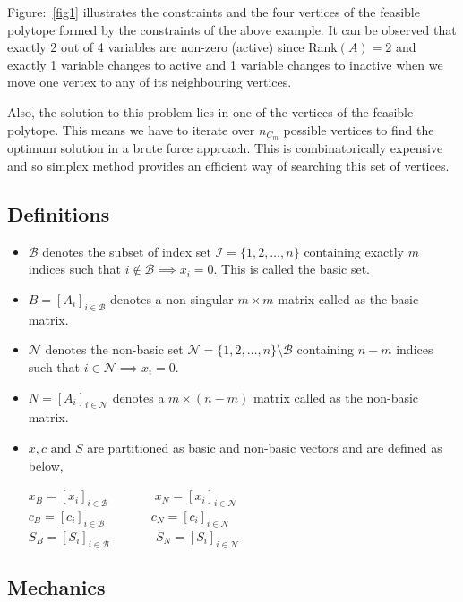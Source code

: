\documentclass[12pt,letterpaper]{article}
\begin{document}
Figure:~\ref{fig1} illustrates the constraints and the four vertices of the feasible polytope formed by the constraints of the above example. It can be observed that exactly 2 out of 4 variables are non-zero (active) since Rank$(A)=2$ and exactly 1 variable changes to active and 1 variable changes to inactive when we move one vertex to any of its neighbouring vertices.

Also, the solution to this problem lies in one of the vertices of the feasible polytope. This means we have to iterate over $n_{C_m}$ possible vertices to find the optimum solution in a brute force approach. This is combinatorically expensive and so simplex method provides an efficient way of searching this set of vertices.

\subsection{Definitions}

\begin{itemize}
	\item $\mathcal{B}$ denotes the subset of index set $\mathcal{I} = \{1,2,\dots,n\}$ containing exactly $m$ indices such that $i \notin \mathcal{B} \implies x_i = 0$. This is called the basic set.
	\item $B = [A_i]_{i \in \mathcal{B}}$ denotes a non-singular $m\times m$ matrix called as the basic matrix.
	\item $\mathcal{N}$ denotes the non-basic set $\mathcal{N} = \{1,2,\dots,n\}\setminus\mathcal{B}$ containing $n-m$ indices such that $i \in \mathcal{N} \implies x_i = 0$.
	\item $N = [A_i]_{i \in \mathcal{N}}$ denotes a $m\times (n-m)$ matrix called as the non-basic matrix.
	\item $x, c \text{ and } S$ are partitioned as basic and non-basic vectors and are defined as below,
	      \begin{center}
				$x_B = [x_i]_{i \in \mathcal{B}}$ ~~~~~~ $x_N = [x_i]_{i \in \mathcal{N}}$ \\
				$c_B = [c_i]_{i \in \mathcal{B}}$ ~~~~~~ $c_N = [c_i]_{i \in \mathcal{N}}$ \\
				$S_B = [S_i]_{i \in \mathcal{B}}$ ~~~~~~ $S_N = [S_i]_{i \in \mathcal{N}}$ \\
	      \end{center}		  
\end{itemize}

\subsection{Mechanics}
\end{document}
